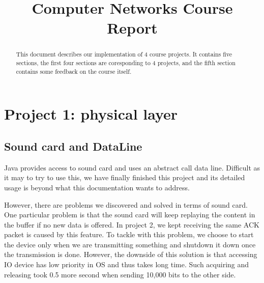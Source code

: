 \documentclass[conference,compsoc]{IEEEtran}
\begin{document}
\title{
	Computer Networks Course Report
}
\author{
\and
}

\maketitle

\begin{abstract}
This document describes our implementation of 4 course projects. It contains five sections, the first four sections are coresponding to 4 projects, and the fifth section contains some feedback on the course itself.
\end{abstract}

\section{Project 1: physical layer}
	\subsection{Sound card and DataLine}
		Java provides access to sound card and uses an abstract call data line. 
		Difficult as it may to try to use this, we have finally finished this project and its detailed usage is beyond what this documentation wants to address.
		\par
		However, there are problems we discovered and solved in terms of sound card.
		One particular problem is that the sound card will keep replaying the content in the buffer if no new data is offered.
		In project 2, we kept receiving the same ACK packet is caused by this feature.
		To tackle with this problem, we choose to start the device only when we are transmitting something and shutdown it down once the transmission is done.
		However, the downside of this solution is that accessing IO device has low priority in OS and thus takes long time. 
		Such acquiring and releasing took 0.5 more second when sending 10,000 bits to the other side.
\end{document}
